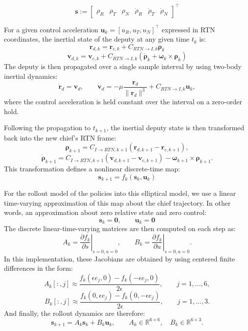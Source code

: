 \[
\mathbf{s} :=
\begin{bmatrix}
\rho_R &
\rho_T &
\rho_N &
\dot{\rho}_R &
\dot{\rho}_T &
\dot{\rho}_N
\end{bmatrix}^{\top}
\]

For a given control acceleration 
$\mathbf{u}_k = [u_R, u_T, u_N]^\top$ expressed in RTN coordinates, the inertial state of the deputy at any given time $t_k$ is:
\[
\mathbf{r}_{d,k} = \mathbf{r}_{c,k} + C_{RTN \to I,k}\boldsymbol{\rho}_k
\]
\[
\mathbf{v}_{d,k} = \mathbf{v}_{c,k} + C_{RTN \to I,k}(\dot{\boldsymbol{\rho}}_k + \boldsymbol{\omega}_k \times \boldsymbol{\rho}_k)
\]
The deputy is then propagated over a single sample interval by using two-body inertial dynamics:
\[
\dot{\mathbf{r}}_d = \mathbf{v}_d,
\qquad
\dot{\mathbf{v}}_d = -\mu \frac{\mathbf{r}_d}{ \|\mathbf{r}_d\|^3} + C_{RTN \to I,k}\mathbf{u}_k,
\]
where the control acceleration is held constant over the interval on a zero-order hold.

Following the propagation to $t_{k+1}$, the inertial deputy state is then transformed back into the new chief's RTN frame:
\[
\boldsymbol{\rho}_{k+1}
=
C_{I\to RTN,k+1}
\left(
\boldsymbol{r}_{d,k+1}-\boldsymbol{r}_{c,k+1}
\right),
\]
\[
\dot{\boldsymbol{\rho}}_{k+1}
=
C_{I\to RTN,k+1}
\left(
\boldsymbol{v}_{d,k+1}-\boldsymbol{v}_{c,k+1}
\right)
-
\boldsymbol{\omega}_{k+1}\times \boldsymbol{\rho}_{k+1}.
\]
This transformation defines a nonlinear discrete-time map:
\[
\mathbf{s}_{k+1} = f_k(\mathbf{s}_k, \mathbf{u}_k)
\]


For the rollout model of the policies into this elliptical model, we use a linear time-varying approximation of this map about the chief trajectory. In other words, an approximation about zero relative state and zero control:
\[
\mathbf{s}_k = \mathbf{0},
\qquad
\mathbf{u}_k = \mathbf{0}
\]
The discrete linear-time-varying matrices are then computed on each step as:
\[
A_k
=
\left.
\frac{\partial f_k}{\partial s}
\right|_{s=0,u=0},
\qquad
B_k
=
\left.
\frac{\partial f_k}{\partial u}
\right|_{s=0,u=0}.
\]
In this implementation, these Jacobians are obtained by using centered finite differences in the form:
\[
A_k[:,j]
\approx
\frac{
f_k(\epsilon e_j,0) - f_k(-\epsilon e_j,0)
}{2\epsilon},
\qquad
j=1,\ldots,6,
\]
\[
B_k[:,j]
\approx
\frac{
f_k(0,\epsilon e_j) - f_k(0,-\epsilon e_j)
}{2\epsilon},
\qquad
j=1,\ldots,3.
\]
And finally, the rollout dynamics are therefore:
\[
\mathbf{s}_{k+1} = A_k\mathbf{s}_k + B_k\mathbf{u}_k,
\qquad
A_k \in \mathbb{R}^{6\times 6},
\quad
B_k \in \mathbb{R}^{6\times 3}.
\]

